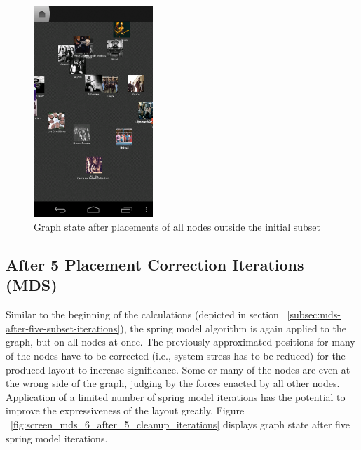 \begin{figure}[H]
  \centering
    \includegraphics[width=0.4\textwidth]{figures/screen_mds_5_after_all_restnode_additions}
  \caption{Graph state after placements of all nodes outside the initial subset}
  \label{fig:screen_mds_5_after_all_restnode_additions}
\end{figure}

\newpage
\subsection{After 5 Placement Correction Iterations (MDS)}

Similar to the beginning of the calculations (depicted in section ~\ref{subsec:mds-after-five-subset-iterations}), the spring model algorithm is again applied to the graph, but on all nodes at once. The previously approximated positions for many of the nodes have to be corrected (i.e., system stress has to be reduced) for the produced layout to increase significance. Some or many of the nodes are even at the wrong side of the graph, judging by the forces enacted by all other nodes. Application of a limited number of spring model iterations has the potential to improve the expressiveness of the layout greatly. Figure ~\ref{fig:screen_mds_6_after_5_cleanup_iterations} displays graph state after five spring model iterations.

